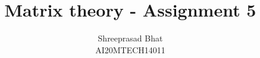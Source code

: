 \documentclass[journal,12pt,twocolumn]{IEEEtran}
\begin{document}
\makeatletter
{}
\makeatother
\let\StandardTheFigure\thefigure
\let\vec\mathbf
\renewcommand{\thefigure}{\theproblem}
\def\putbox#1#2#3{\makebox[0in][l]{\makebox[#1][l]{}\raisebox{\baselineskip}[0in][0in]{\raisebox{#2}[0in][0in]{#3}}}}
     \def\rightbox#1{\makebox[0in][r]{#1}}
     \def\centbox#1{\makebox[0in]{#1}}
     \def\topbox#1{\raisebox{-\baselineskip}[0in][0in]{#1}}
     \def\midbox#1{\raisebox{-0.5\baselineskip}[0in][0in]{#1}}
\vspace{3cm}
\title{Matrix theory - Assignment 5}
\author{Shreeprasad Bhat\\AI20MTECH14011}
%
%
%
% 
%
\end{document}
